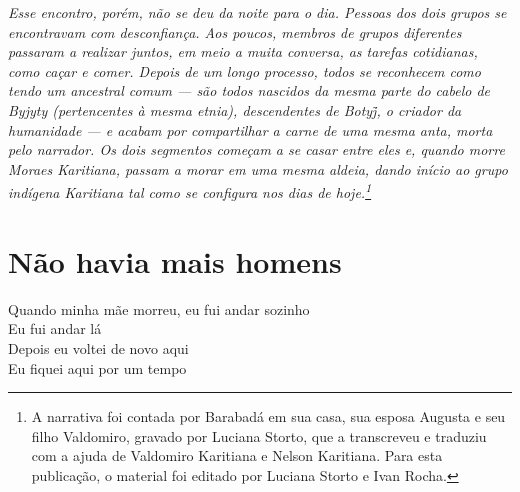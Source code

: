 \thispagestyle{empty}
\mbox{}
\vfill
\noindent{}\textit{}

\textit{Esse encontro, porém, não se deu da noite para o dia. Pessoas dos dois grupos se encontravam com desconfiança. Aos poucos, membros de grupos diferentes passaram a realizar juntos, em meio a muita conversa, as tarefas cotidianas, como caçar e comer. Depois de um longo processo, todos se reconhecem como tendo um ancestral comum --- são todos nascidos da mesma parte do cabelo de Byjyty (pertencentes à mesma etnia), descendentes de Botyj̃, o criador da humanidade --- e acabam por compartilhar a carne de uma mesma anta, morta pelo narrador. Os dois segmentos começam a se casar entre eles e, quando morre Moraes Karitiana, passam a morar em uma mesma aldeia, dando início ao grupo indígena Karitiana tal como se configura nos dias de hoje.\footnote{A narrativa foi contada por Barabadá em sua casa, sua esposa Augusta e seu filho Valdomiro, gravado por Luciana Storto, que a transcreveu e traduziu com a ajuda de Valdomiro Karitiana e Nelson Karitiana. Para esta publicação, o material foi editado por Luciana Storto e Ivan Rocha.}}
\pagebreak


\chapter*{Não havia mais homens} 

\begin{linenumbers}\begingroup\raggedright
  \noindent Quando minha mãe morreu, eu fui andar sozinho\\
  Eu fui andar lá\\
  Depois eu voltei de novo aqui\\
  Eu fiquei aqui por um tempo
 
\end{linenumbers}\endgroup

